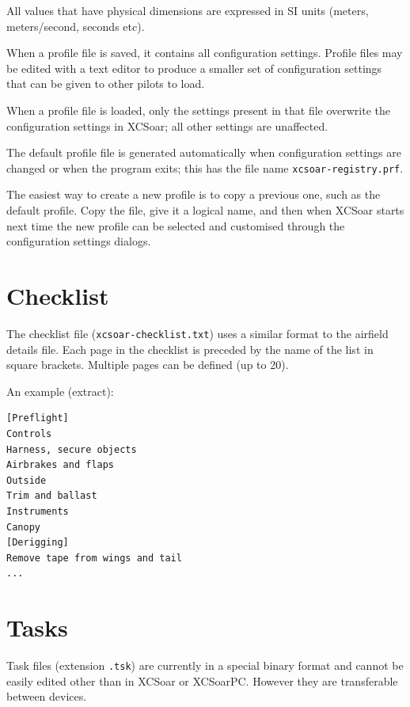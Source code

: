 \documentclass[a4paper,12pt]{refrep}
\begin{document}
All values that have physical dimensions are expressed in SI units
(meters, meters/second, seconds etc).

When a profile file is saved, it contains all configuration settings.
Profile files may be edited with a text editor to produce a smaller
set of configuration settings that can be given to other pilots to
load.  

When a profile file is loaded, only the settings present in that file
overwrite the configuration settings in XCSoar; all other settings are
unaffected.

The default profile file is generated automatically when configuration
settings are changed or when the program exits; this has the
file name \verb|xcsoar-registry.prf|.

The easiest way to create a new profile is to copy a previous one,
such as the default profile.  Copy the file, give it a logical name,
and then when XCSoar starts next time the new profile can be selected
and customised through the configuration settings dialogs.



\section{Checklist}

The checklist file (\verb|xcsoar-checklist.txt|) uses a similar format to
the airfield details file.  Each page in the checklist is preceded by
the name of the list in square brackets.  Multiple pages can be
defined (up to 20).

An example (extract):
\begin{verbatim}
[Preflight]
Controls
Harness, secure objects
Airbrakes and flaps
Outside
Trim and ballast
Instruments
Canopy
[Derigging]
Remove tape from wings and tail
...
\end{verbatim}

\section{Tasks}
Task files (extension \verb|.tsk|) are currently in a special binary
format and cannot be easily edited other than in XCSoar or XCSoarPC.
However they are transferable between devices.
\end{document}
